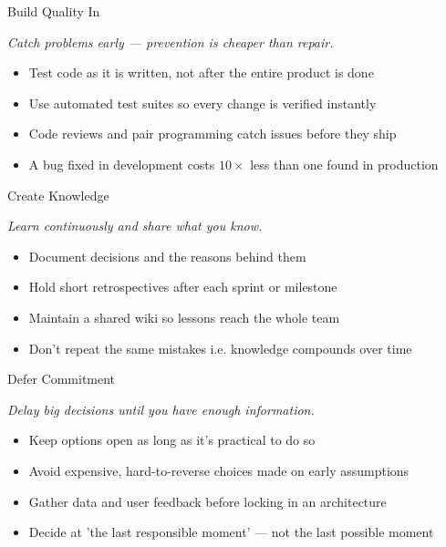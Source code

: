 \documentclass{thapathali}
\begin{document}
\begin{frame}{Build Quality In}
    \begin{center}
        \textit{Catch problems early --- prevention is cheaper than repair.}
    \end{center}
    \vspace{0.8em}
    
    \begin{itemize}
        \item Test code as it is written, not after the entire product is done
        \item Use automated test suites so every change is verified instantly
        \item Code reviews and pair programming catch issues before they ship
        \item A bug fixed in development costs $10\times$ less than one found in production
    \end{itemize}
\end{frame}

\begin{frame}{Create Knowledge}
    \begin{center}
        \textit{Learn continuously and share what you know.}
    \end{center}
    \vspace{0.8em}
    
    \begin{itemize}
        \item Document decisions and the reasons behind them
        \item Hold short retrospectives after each sprint or milestone
        \item Maintain a shared wiki so lessons reach the whole team
        \item Don't repeat the same mistakes i.e. knowledge compounds over time
    \end{itemize}
\end{frame}

\begin{frame}{Defer Commitment}
    \begin{center}
        \textit{Delay big decisions until you have enough information.}
    \end{center}
    \vspace{0.8em}
    
    \begin{itemize}
        \item Keep options open as long as it's practical to do so
        \item Avoid expensive, hard-to-reverse choices made on early assumptions
        \item Gather data and user feedback before locking in an architecture
        \item Decide at 'the last responsible moment' --- not the last possible moment
    \end{itemize}
\end{frame}
\end{document}
